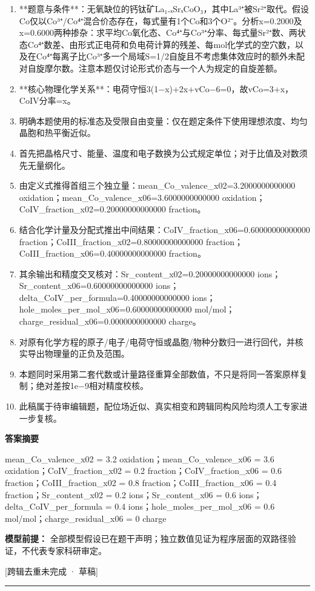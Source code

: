 \documentclass[UTF8,11pt,a4paper]{ctexart}
\begin{document}
\begin{enumerate}
\item **题意与条件**：无氧缺位的钙钛矿La₁₋ₓSrₓCoO₃，其中La³⁺被Sr²⁺取代。假设Co仅以Co³⁺/Co⁴⁺混合价态存在，每式量有1个Co和3个O²⁻。分析x=0.2000及x=0.6000两种掺杂：求平均Co氧化态、Co⁴⁺与Co³⁺分率、每式量Sr²⁺数、两状态Co⁴⁺数差、由形式正电荷和负电荷计算的残差、每mol化学式的空穴数，以及在Co⁴⁺每离子比Co³⁺多一个局域S=1/2自旋且不考虑集体效应时的额外未配对自旋摩尔数。注意本题仅讨论形式价态与一个人为规定的自旋差额。
\item **核心物理化学关系**：电荷守恒3(1−x)+2x+vCo−6=0，故vCo=3+x，CoIV分率=x。
\item 明确本题使用的标准态及受限自由变量：仅在题定条件下使用理想浓度、均匀晶胞和热平衡近似。
\item 首先把晶格尺寸、能量、温度和电子数换为公式规定单位；对于比值及对数须先无量纲化。
\item 由定义式推得首组三个独立量：mean\_Co\_valence\_x02=3.2000000000000 oxidation；mean\_Co\_valence\_x06=3.6000000000000 oxidation；CoIV\_fraction\_x02=0.20000000000000 fraction。
\item 结合化学计量及分配式推出中间结果：CoIV\_fraction\_x06=0.60000000000000 fraction；CoIII\_fraction\_x02=0.80000000000000 fraction；CoIII\_fraction\_x06=0.40000000000000 fraction。
\item 其余输出和精度交叉核对：Sr\_content\_x02=0.20000000000000 ions；Sr\_content\_x06=0.60000000000000 ions；delta\_CoIV\_per\_formula=0.40000000000000 ions；hole\_moles\_per\_mol\_x06=0.60000000000000 mol/mol；charge\_residual\_x06=0.0000000000000 charge。
\item 对原有化学方程的原子/电子/电荷守恒或晶胞/物种分数归一进行回代，并核实导出物理量的正负及范围。
\item 本题同时采用第二套代数或计量路径重算全部数值，不只是将同一答案原样复制；绝对差按1e−9相对精度校核。
\item 此稿属于待审编辑题，配位场近似、真实相变和跨辑同构风险均须人工专家进一步复核。
\end{enumerate}
\noindent\textbf{答案摘要}\par
mean\_Co\_valence\_x02 = 3.2 oxidation；mean\_Co\_valence\_x06 = 3.6 oxidation；CoIV\_fraction\_x02 = 0.2 fraction；CoIV\_fraction\_x06 = 0.6 fraction；CoIII\_fraction\_x02 = 0.8 fraction；CoIII\_fraction\_x06 = 0.4 fraction；Sr\_content\_x02 = 0.2 ions；Sr\_content\_x06 = 0.6 ions；delta\_CoIV\_per\_formula = 0.4 ions；hole\_moles\_per\_mol\_x06 = 0.6 mol/mol；charge\_residual\_x06 = 0 charge\par
\noindent\textbf{模型前提：}
全部模型假设已在题干声明；独立数值见证为程序层面的双路径验证，不代表专家科研审定。\par
\noindent\textcolor{red!65!black}{[跨辑去重未完成 · 草稿]} \par
\medskip\hrule\medskip
{}
\end{document}
